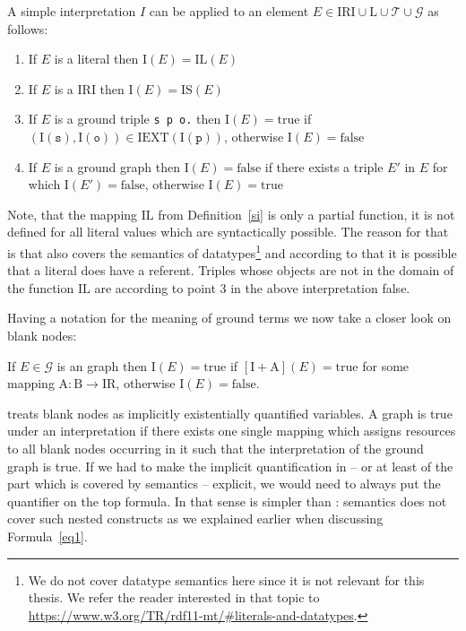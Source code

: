 \begin{definition}
A simple interpretation $I$ can be applied to an element $E\in \mathrm{IRI}\cup\mathrm{L}\cup\mathcal{T}\cup\mathcal{G}$ as follows: 
\begin{enumerate}
 \item If $E$ is a literal then $\mathrm{I}(E)=\mathrm{IL}(E)$
 \item If $E$ is a IRI then $\mathrm{I}(E)=\mathrm{IS}(E)$
 \item If $E$ is a ground triple \texttt{s p o.} then $ \mathrm{I}(E)=\text{true}$ if $(\mathrm{I}(\texttt{s}), \mathrm{I}(\texttt{o}))\in \mathrm{IEXT}(\mathrm{I}(\texttt{p}))$, otherwise 
 $\mathrm{I}(E)=\text{false}$
 \item If $E$ is a ground graph then $\mathrm{I}(E)=\text{false}$ if there exists a triple $E'$ in $E$ for which $\mathrm{I}(E')=\text{false}$, otherwise $\mathrm{I}(E)=\text{true}$ 
 \end{enumerate}
\end{definition}
Note, that the mapping $\mathrm{IL}$ from Definition~\ref{si} is only a partial function, \ie it is not defined for all literal values which are syntactically possible. 
The reason for that is that \rdf also covers the semantics of datatypes\footnote{We do not cover datatype semantics here since it is not relevant for this thesis. We refer the reader interested in that topic 
to \url{https://www.w3.org/TR/rdf11-mt/\#literals-and-datatypes}.} and according to that it is possible that a literal does have a referent. 
Triples whose objects are not in the domain of the function $\mathrm{IL}$ are according to point 3 in the above interpretation false.

Having a notation for the meaning of ground terms we now take a closer look on blank nodes: %
\begin{definition}\label{rdfbl}
 If $E\in \mathcal{G}$ is an \rdf graph then  $\mathrm{I}(E)=\text{true}$ if $[\mathrm{I}+\mathrm{A}](E)=\text{true}$ for some mapping $\mathrm{A}: \mathrm{B} \rightarrow \mathrm{IR}$, 
 otherwise $\mathrm{I}(E)=\text{false}$.
\end{definition}
\rdf treats blank nodes as implicitly existentially quantified variables. 
A graph is true under an interpretation if there exists one single mapping which assigns resources to all blank nodes occurring in it such that the interpretation of 
the ground graph is true. If we had to make the implicit quantification in \rdf{} -- or at least of the part which is covered by \rdf semantics -- explicit, we would need to 
always put the quantifier on the top formula. In that sense \rdf is simpler than \nthree: \rdf semantics does not cover such nested constructs as we explained earlier when 
discussing Formula~\ref{eq1}.

